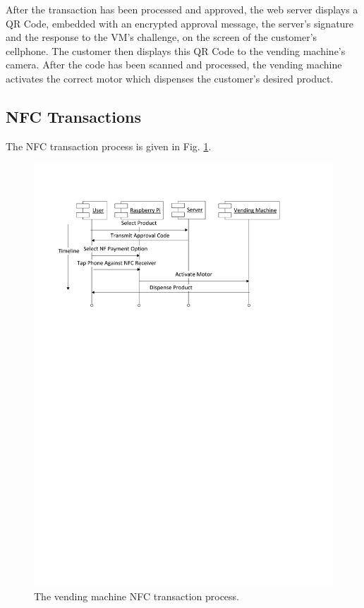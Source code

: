 After the transaction has been processed and approved, the web server displays a
QR Code, embedded with an encrypted approval message, the server's signature
and the response to the VM's challenge, on the screen of the customer's cellphone. The
customer then displays this QR Code to the vending machine's camera. After the code has
been scanned and processed, the vending machine activates the correct motor which
dispenses the customer's desired product.

\subsection{NFC Transactions}

The NFC transaction process is given in Fig. \ref{fig:vm_nfc_interaction}.

\begin{figure}
 \centering 
 \includegraphics[clip=true, trim = 0 550 40 70, scale=0.7]{nfc_transaction_processflow}
 \caption{The vending machine NFC transaction process.}
 \label{fig:vm_nfc_interaction}
\end{figure}

